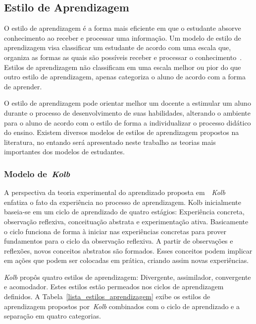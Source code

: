 \subsection{Estilo de Aprendizagem}
O estilo de aprendizagem é a forma mais eficiente em que o estudante absorve conhecimento ao receber e processar uma informação. Um modelo de estilo de aprendizagem visa classificar um estudante de acordo com uma escala que, organiza as formas as quais são possíveis receber e processar o conhecimento~\cite{felder1988learning}. Estilos de aprendizagem não classificam em uma escala melhor ou pior do que outro estilo de aprendizagem, apenas categoriza o aluno de acordo com a forma de aprender.

O estilo de aprendizagem pode orientar melhor um docente a estimular um aluno durante o processo de desenvolvimento de suas habilidades, alterando o ambiente para o aluno de acordo com o estilo de forma a individualizar o processo didático do ensino. Existem diversos modelos de estilos de aprendizagem propostos na literatura, no entando será apresentado neste trabalho as teorias mais importantes dos modelos de estudantes.

\subsubsection{Modelo de~\emph{Kolb}}

A perspectiva da teoria experimental do aprendizado proposta em~~\emph{Kolb}~\cite{kolb84} enfatiza o fato da experiência no processo de aprendizagem. Kolb inicialmente baseia-se em um ciclo de aprendizado de quatro estágios: Experiência concreta, observação reflexiva, conceituação abstrata e experimentação ativa. Basicamente o ciclo funciona de forma à iniciar nas experiências concretas para prover fundamentos para o ciclo da observação reflexiva. A partir de observações e reflexões, novos conceitos abstratos são formados. Esses conceitos podem implicar em ações que podem ser colocadas em prática, criando assim novas experiências.

\emph{Kolb} propôs quatro estilos de aprendizagem: Divergente, assimilador, convergente e acomodador. Estes estilos estão permeados nos ciclos de aprendizagem definidos. A Tabela~\ref{lista_estilos_aprendizagem} exibe os estilos de aprendizagem propostos por~\emph{Kolb} combinados com o ciclo de aprendizado e a separação em quatro categorias.

